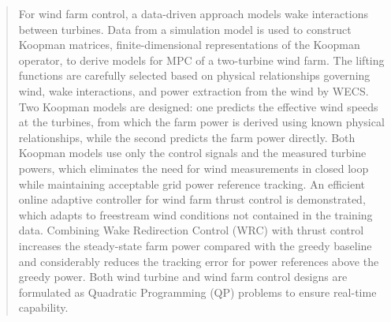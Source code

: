 \documentclass[12pt,a4paper,twoside,openright]{report}
\begin{document}
\begin{abstract}
For wind farm control, a data-driven approach models wake interactions between turbines. Data from a simulation model is used to construct Koopman matrices, finite-dimensional representations of the Koopman operator, to derive models for MPC of a two-turbine wind farm. The lifting functions are carefully selected based on physical relationships governing wind, wake interactions, and power extraction from the wind by WECS. Two Koopman models are designed: one predicts the effective wind speeds at the turbines, from which the farm power is derived using known physical relationships, while the second predicts the farm power directly. Both Koopman models use only the control signals and the measured turbine powers, which eliminates the need for wind measurements in closed loop while maintaining acceptable grid power reference tracking. An efficient online adaptive controller for wind farm thrust control is demonstrated, which adapts to freestream wind conditions not contained in the training data. Combining Wake Redirection Control (WRC) with thrust control increases the steady-state farm power compared with the greedy baseline and considerably reduces the tracking error for power references above the greedy power. Both wind turbine and wind farm control designs are formulated as Quadratic Programming (QP) problems to ensure real-time capability.
\end{abstract}
\cleardoublepage
\end{document}
